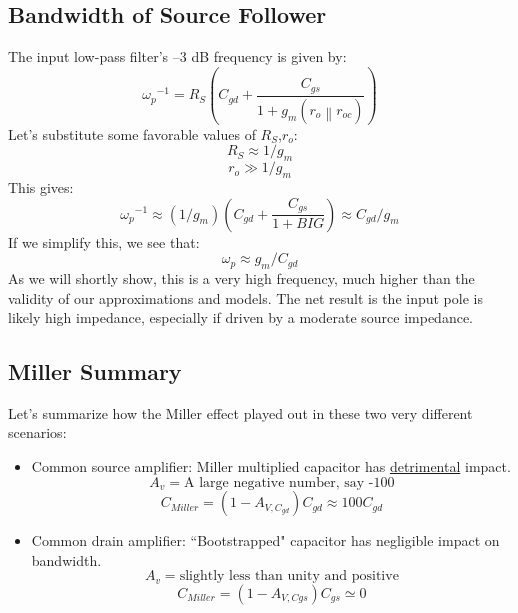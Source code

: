 \subsection{Bandwidth of Source Follower}
The input low-pass filter’s –3 dB frequency is given by:
    \begin{equation} 
        {\omega _p}^{ - 1} = {R_S}\left( {{C_{gd}} + \frac{{{C_{gs}}}}{{1 + {g_m}(\left. {{r_o}} \right\|{r_{oc}})}}} \right)
    \end{equation}
Let's substitute some favorable values of $R_S$,$r_o$:
    \begin{equation} 
        {R_S} \approx 1/{g_m} 
    \end{equation}
    \begin{equation} 
        {r_o} \gg 1/{g_m} 
    \end{equation}
This gives:
    \begin{equation} 
        {\omega _p}^{ - 1} \approx \left( {1/{g_m}} \right)\left( {{C_{gd}} + \frac{{{C_{gs}}}}{{1 + BIG}}} \right) \approx {C_{gd}}/{g_m} 
    \end{equation}
If we simplify this, we see that:
    \begin{equation}
        {\omega _p} \approx {g_m}/{C_{gd}}
    \end{equation}
As we will shortly show, this is a very high frequency, much higher than the validity of our approximations and models.  The net result is the input pole is likely high impedance, especially if driven by a moderate source impedance.
\subsection{Miller Summary}
Let's summarize how the Miller effect played out in these two very different scenarios:
\begin{itemize}
    \item Common source amplifier:  Miller multiplied capacitor has \underline{detrimental} impact.
        \[
        	A_v = \text{A large negative number, say -100} 
        \]
        \[	
        	{C_{Miller}} = (1 - {A_{V,{C_{gd}}}}){C_{gd}} \approx 100{C_{gd}}
        \]
    \item Common drain amplifier:  ``Bootstrapped" capacitor has negligible impact on bandwidth.
        \[
        	A_v = \text{slightly less than unity and positive} 
        \]
        \[
        	{C_{Miller}} = (1 - {A_{V,Cgs}}){C_{gs}} \simeq 0
        \]
\end{itemize}
